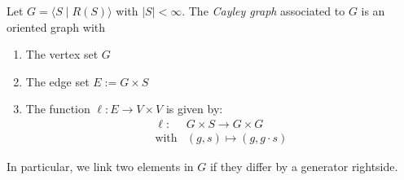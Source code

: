 \begin{definition}
Let $G=\langle S\mid R(S)\rangle$ with $|S|<\infty$.
The \emph{Cayley graph} associated to $G$ is an oriented graph with
\begin{enumerate}
\item
The vertex set $G$
\item
The edge set $E:=G\times S$
\item
The function $\ell:E\to V\times V$ is given by:
\[
\begin{array}{ll}
\ell:&G\times S\to G\times G\\
\text{with}&(g,s)\mapsto(g,g\cdot s)
\end{array}
\]
\end{enumerate}
In particular, we link two elements in $G$ if they differ by a generator rightside.
\end{definition}
